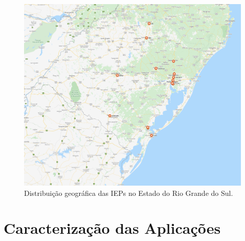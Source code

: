 \documentclass[tese,capa]{texufpel}
\begin{document}
\begin{figure}[H]
	\centering 
	\includegraphics[scale=.25]{images/IEP.png}
	\caption[Distribuição geográfica das IEPs no Estado do Rio Grande do Sul.]{Distribuição geográfica das IEPs no Estado do Rio Grande do Sul.} 
	\label{fig:IEP}
\end{figure}

\section{Caracterização das Aplicações}\label{sec:caracaplic}

\end{document}
